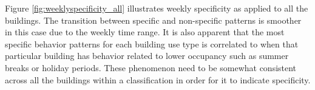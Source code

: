 Figure \ref{fig:weeklyspecificity_all} illustrates weekly specificity as applied to all the buildings. The transition between specific and non-specific patterns is smoother in this case due to the weekly time range. It is also apparent that the most specific behavior patterns for each building use type is correlated to when that particular building has behavior related to lower occupancy such as summer breaks or holiday periods. These phenomenon need to be somewhat consistent across all the buildings within a classification in order for it to indicate specificity.  